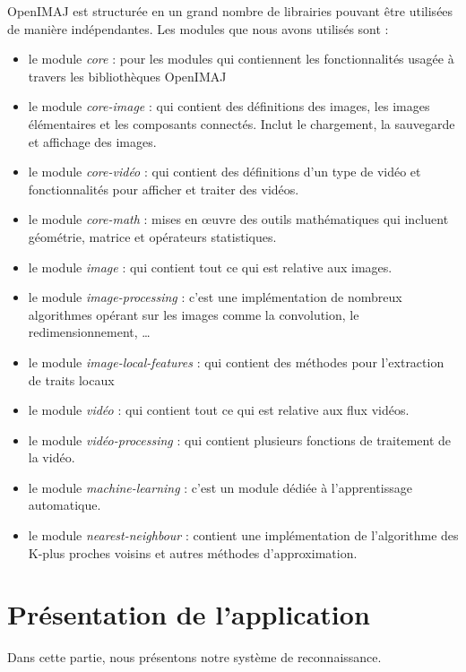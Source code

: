 OpenIMAJ est structurée en un grand nombre de librairies pouvant être utilisées de manière indépendantes. Les modules que nous avons utilisés sont : 
\begin{itemize}
	\item [\textbullet]  le module \textit{core} :  pour les modules qui contiennent les fonctionnalités usagée à travers les bibliothèques OpenIMAJ
	\item [\textbullet] le module \textit{core-image} : qui contient des définitions des images, les images élémentaires et les composants connectés.  Inclut le chargement, la sauvegarde et affichage des images.
	\item [\textbullet] le module \textit{core-vidéo} : qui contient des définitions d'un type de vidéo et fonctionnalités pour afficher et traiter des vidéos.
	\item [\textbullet]le module \textit{core-math} : mises en œuvre des outils mathématiques qui incluent géométrie, matrice et opérateurs statistiques.
		\item [\textbullet] le module \textit{image} : qui contient tout ce qui est relative aux images.
		\item [\textbullet] le module \textit{image-processing} : c'est une implémentation de nombreux algorithmes opérant sur les images comme la convolution, le redimensionnement, \ldots
		\item [\textbullet] le module \textit{image-local-features} :	qui contient des méthodes pour l'extraction de traits locaux
		\item [\textbullet] le module \textit{vidéo} : qui contient tout ce qui est relative aux flux vidéos.
		\item [\textbullet] le module \textit{vidéo-processing} : qui contient plusieurs fonctions de traitement de la vidéo.
		\item [\textbullet] le module \textit{machine-learning} : c'est un module dédiée à l'apprentissage automatique.
		\item [\textbullet] le module \textit{nearest-neighbour} : contient une implémentation de l'algorithme des K-plus proches voisins et autres méthodes d'approximation.
\end{itemize}
\section{Présentation de l'application}

Dans cette partie, nous présentons notre système de reconnaissance.
